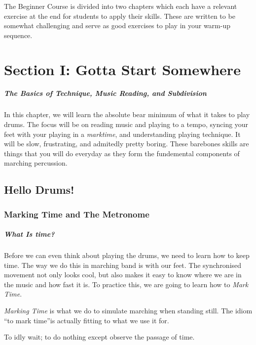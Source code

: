 \documentclass[12pt,letterpaper]{book}
\begin{document}
The Beginner Course is divided into two chapters which each have a relevant exercise at the end for students to apply their skills.  These are written to be somewhat challenging and serve as good exercises to play in your warm-up sequence.

\chapter{Section I: Gotta Start Somewhere}

\paragraph{The Basics of Technique, Music Reading, and Subdivision}

In this chapter, we will learn the absolute bear minimum of what it takes to play drums.  The focus will be on reading music and playing to a tempo, syncing your feet with your playing in a \textit{marktime}, and understanding playing technique.  It will be slow, frustrating, and admitedly pretty boring.  These barebones skills are things that you will do everyday as they form the fundemental components of marching percussion.

\section{Hello Drums!}
 
\subsection{Marking Time and The Metronome}

\paragraph{What Is time?} 

Before we can even think about playing the drums, we need to learn how to keep time. The way we do this in marching band is with our feet.  The synchronised movement not only looks cool, but also makes it easy to know where we are in the music and how fast it is.  To practice this, we are going to learn how to \textit{Mark Time}.

\textit{Marking Time} is what we do to simulate marching when standing still.  The idiom \textquotedblleft to mark time\textquotedblright \space is actually fitting to what we use it for.

To idly wait; to do nothing except observe the passage of time.
\end{document}
